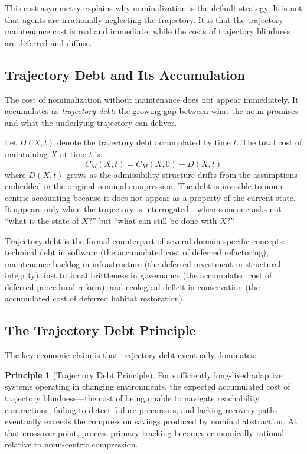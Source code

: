 \documentclass[12pt, a4paper]{article}
\theoremstyle{plain}
\theoremstyle{definition}
\newtheorem{principle}[theorem]{Principle}
\theoremstyle{remark}
\begin{document}
This cost asymmetry explains why nominalization is the default strategy.
It is not that agents are irrationally neglecting the trajectory. It is that
the trajectory maintenance cost is real and immediate, while the costs of
trajectory blindness are deferred and diffuse.

\subsection{Trajectory Debt and Its Accumulation}

The cost of nominalization without maintenance does not appear immediately.
It accumulates as \emph{trajectory debt}: the growing gap between what the
noun promises and what the underlying trajectory can deliver.

Let $D(X, t)$ denote the trajectory debt accumulated by time $t$. The
total cost of maintaining $X$ at time $t$ is:
$$C_M(X, t) = C_M(X, 0) + D(X, t)$$
where $D(X, t)$ grows as the admissibility structure drifts from the
assumptions embedded in the original nominal compression. The debt is
invisible to noun-centric accounting because it does not appear as a
property of the current state. It appears only when the trajectory is
interrogated---when someone asks not ``what is the state of $X$?'' but
``what can still be done with $X$?''

Trajectory debt is the formal counterpart of several domain-specific concepts:
technical debt in software (the accumulated cost of deferred refactoring),
maintenance backlog in infrastructure (the deferred investment in structural
integrity), institutional brittleness in governance (the accumulated cost of
deferred procedural reform), and ecological deficit in conservation (the
accumulated cost of deferred habitat restoration).

\subsection{The Trajectory Debt Principle}

The key economic claim is that trajectory debt eventually dominates:

\begin{principle}[Trajectory Debt Principle]
\label{prin:debt}
For sufficiently long-lived adaptive systems operating in changing environments,
the expected accumulated cost of trajectory blindness---the cost of being
unable to navigate reachability contractions, failing to detect failure
precursors, and lacking recovery paths---eventually exceeds the compression
savings produced by nominal abstraction. At that crossover point, process-primary
tracking becomes economically rational relative to noun-centric compression.
\end{principle}
\end{document}
